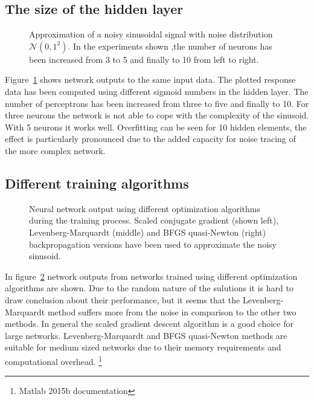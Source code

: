 \subsection{The size of the hidden layer}
\begin{figure}



\caption{Approximation of a noisy sinusoidal signal with noise distribution $\mathcal{N}(0,1^2)$. In the experiments shown ,the number of neurons has been increased from 3 to 5 and finally to 10 from left to right.}
\label{fig:noisyCase3}
\end{figure}
Figure~\ref{fig:noisyCase3} shows network outputs to the same input data. The plotted response data has been computed using different sigmoid numbers in the hidden layer. The number of perceptrons has been increased from three to five and finally to 10. For three neurons the network is not able to cope with the complexity of the sinusoid. With 5 neurons it works well. Overfitting can be seen for 10 hidden elements, the effect is particularly pronounced due to the added capacity for noise tracing of the more complex network.

\subsection{Different training algorithms}
\begin{figure}



\caption{Neural network output using different optimization algorithms during the training process. Scaled conjugate gradient (shown left), Levenberg-Marquardt (middle) and BFGS quasi-Newton (right) backpropagation versions have been used to approximate the noisy sinusoid.}
\label{fig:noisyCase4}
\end{figure}
In figure~\ref{fig:noisyCase4} network outputs from networks trained using different optimization algorithms are shown. 
Due to the random nature of the sulutions it is hard to draw conclusion about their performance, but it seems that the Levenberg-Marquardt method suffers more from the noise in comparison to the other two methods. In general the scaled gradient descent algorithm is a good choice for large networks. Levenberg-Marquardt and BFGS quasi-Newton methods are suitable for medium sized networks due to their memory requirements and computational overhead. \footnote{Matlab 2015b documentation}

